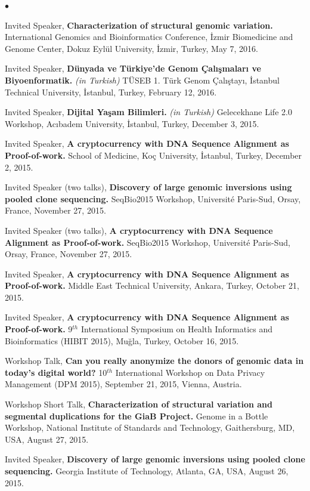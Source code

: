 \documentclass[margin,line]{res}
\newenvironment{list2}{
  \begin{list}{$\bullet$}{%
      \setlength{\itemsep}{0.1cm}
      \setlength{\parsep}{0in} \setlength{\parskip}{0in}
      \setlength{\topsep}{0in} \setlength{\partopsep}{0in} 
      \setlength{\leftmargin}{0.2in}}}{\end{list}}
\begin{document}
\begin{resume}
\begin{list2}
{\item
  Invited Speaker, 
  {\bf Characterization of structural genomic variation.}
  International Genomics and Bioinformatics Conference,
  İzmir Biomedicine and Genome Center, Dokuz Eylül University, İzmir, Turkey, May 7, 2016.
\item
  Invited Speaker,
  {\bf Dünyada ve Türkiye'de Genom Çalışmaları ve Biyoenformatik.} {\it (in Turkish)}
  TÜSEB 1. Türk Genom Çalıştayı, İstanbul Technical University, İstanbul, Turkey, February 12, 2016.
\item
  Invited Speaker,
  {\bf Dijital Yaşam Bilimleri.} {\it (in Turkish)}
  Gelecekhane Life 2.0 Workshop, Acıbadem University, \.{I}stanbul, Turkey, December 3, 2015.
\item
  Invited Speaker,
  {\bf A cryptocurrency with DNA Sequence Alignment as Proof-of-work.}
  School of Medicine, Ko\c{c} University, \.{I}stanbul, Turkey, December 2, 2015.
\item
  Invited Speaker (two talks), 
  {\bf Discovery of large genomic inversions using pooled clone sequencing.}
  SeqBio2015 Workshop, Université Paris-Sud, Orsay, France, November 27, 2015.
\item
  Invited Speaker (two talks), 
  {\bf A cryptocurrency with DNA Sequence Alignment as Proof-of-work.}
  SeqBio2015 Workshop, Université Paris-Sud, Orsay, France, November 27, 2015.
\item
  Invited Speaker,
  {\bf A cryptocurrency with DNA Sequence Alignment as Proof-of-work.}
  Middle East Technical University, Ankara, Turkey, October 21, 2015.
\item
  Invited Speaker,
  {\bf A cryptocurrency with DNA Sequence Alignment as Proof-of-work.}
  9$^{th}$ International Symposium on Health Informatics and Bioinformatics (HIBIT 2015),
   Muğla, Turkey, October 16, 2015.
 \item
  Workshop Talk, 
  {\bf Can you really anonymize the donors of genomic data in today's digital world?}
  10$^{th}$ International Workshop on Data Privacy Management (DPM 2015), 
  September 21, 2015, Vienna, Austria.
\item
  Workshop Short Talk, 
  {\bf Characterization of structural variation and segmental duplications for the GiaB Project.}
  Genome in a Bottle Workshop, National Institute of Standards and Technology, Gaithersburg, MD, USA,
  August 27, 2015.
\item
  Invited Speaker, 
  {\bf Discovery of large genomic inversions using pooled clone sequencing.}
  Georgia Institute of Technology, Atlanta, GA, USA, August 26, 2015.


}
\end{list2}
\end{resume}
\end{document}
